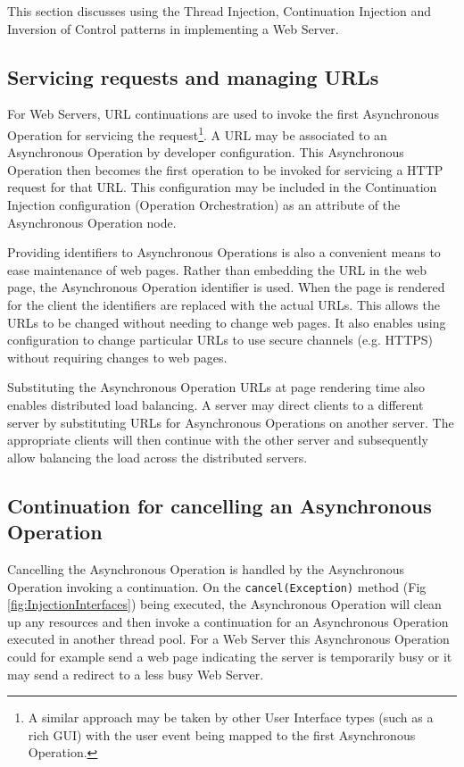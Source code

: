 \documentclass[prodmode]{style/acmlarge}
\begin{document}
This section discusses using the Thread Injection, Continuation Injection and
Inversion of Control patterns in implementing a Web Server.


\subsection{Servicing requests and managing URLs}

For Web Servers, URL continuations \cite{url-continuation} are used to invoke
the first Asynchronous Operation for servicing the request\footnote{A similar
approach may be taken by other User Interface types (such as a rich GUI) with
the user event being mapped to the first Asynchronous Operation.}.  A URL may be
associated to an Asynchronous Operation by developer configuration.  This
Asynchronous Operation then becomes the first operation to be invoked for
servicing a HTTP request for that URL.  This configuration may be included in
the Continuation Injection configuration (Operation Orchestration) as an
attribute of the Asynchronous Operation node.

Providing identifiers to Asynchronous Operations is also a convenient means to
ease maintenance of web pages.  Rather than embedding the URL in the web page,
the Asynchronous Operation identifier is used.  When the page is rendered for
the client the identifiers are replaced with the actual URLs.  This allows the
URLs to be changed without needing to change web pages.  It also enables using
configuration to change particular URLs to use secure channels (e.g. HTTPS)
without requiring changes to web pages.

Substituting the Asynchronous Operation URLs at page rendering time also enables
distributed load balancing.  A server may direct clients to a different server
by substituting URLs for Asynchronous Operations on another server. The
appropriate clients will then continue with the other server and subsequently
allow balancing the load across the distributed servers.


\subsection{Continuation for cancelling an Asynchronous Operation}

Cancelling the Asynchronous Operation is handled by the Asynchronous Operation
invoking a continuation.  On the \texttt{cancel(Exception)} method (Fig
\ref{fig:InjectionInterfaces}) being executed, the Asynchronous Operation will
clean up any resources and then invoke a continuation for an Asynchronous
Operation executed in another thread pool.  For a Web Server this Asynchronous
Operation could for example send a web page indicating the server is temporarily
busy or it may send a redirect to a less busy Web Server.
\end{document}
